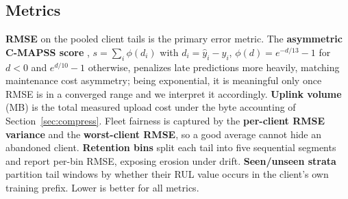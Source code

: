 \documentclass[journal]{IEEEtran}
\begin{document}
\subsection{Metrics}\label{sec:metrics}
\textbf{RMSE} on the pooled client tails is the primary error metric. The \textbf{asymmetric C-MAPSS score} \cite{saxena2008}, $s = \sum_i \phi(d_i)$ with $d_i = \hat{y}_i - y_i$, $\phi(d) = e^{-d/13} - 1$ for $d < 0$ and $e^{d/10} - 1$ otherwise, penalizes late predictions more heavily, matching maintenance cost asymmetry; being exponential, it is meaningful only once RMSE is in a converged range and we interpret it accordingly. \textbf{Uplink volume} (MB) is the total measured upload cost under the byte accounting of Section~\ref{sec:compress}. Fleet fairness is captured by the \textbf{per-client RMSE variance} and the \textbf{worst-client RMSE}, so a good average cannot hide an abandoned client. \textbf{Retention bins} split each tail into five sequential segments and report per-bin RMSE, exposing erosion under drift. \textbf{Seen/unseen strata} partition tail windows by whether their RUL value occurs in the client's own training prefix. Lower is better for all metrics.
\end{document}
